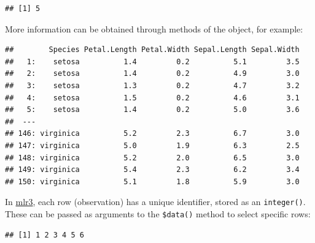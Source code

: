 \documentclass[]{scrbook}
\newenvironment{Shaded}{\begin{snugshade}}{\end{snugshade}}
\newcommand{\CommentTok}[1]{\textcolor[rgb]{0.56,0.35,0.01}{\textit{#1}}}
\newcommand{\DataTypeTok}[1]{\textcolor[rgb]{0.13,0.29,0.53}{#1}}
\newcommand{\DecValTok}[1]{\textcolor[rgb]{0.00,0.00,0.81}{#1}}
\newcommand{\KeywordTok}[1]{\textcolor[rgb]{0.13,0.29,0.53}{\textbf{#1}}}
\newcommand{\NormalTok}[1]{#1}
\newcommand{\OperatorTok}[1]{\textcolor[rgb]{0.81,0.36,0.00}{\textbf{#1}}}
\renewenvironment{Shaded} {\begin{snugshade}\small} {\end{snugshade}}
\begin{document}
\begin{verbatim}
## [1] 5
\end{verbatim}

More information can be obtained through methods of the object, for example:

\begin{Shaded}
\end{Shaded}

\begin{verbatim}
##        Species Petal.Length Petal.Width Sepal.Length Sepal.Width
##   1:    setosa          1.4         0.2          5.1         3.5
##   2:    setosa          1.4         0.2          4.9         3.0
##   3:    setosa          1.3         0.2          4.7         3.2
##   4:    setosa          1.5         0.2          4.6         3.1
##   5:    setosa          1.4         0.2          5.0         3.6
##  ---                                                            
## 146: virginica          5.2         2.3          6.7         3.0
## 147: virginica          5.0         1.9          6.3         2.5
## 148: virginica          5.2         2.0          6.5         3.0
## 149: virginica          5.4         2.3          6.2         3.4
## 150: virginica          5.1         1.8          5.9         3.0
\end{verbatim}

In \href{https://mlr3.mlr-org.com}{mlr3}, each row (observation) has a unique identifier, stored as an \texttt{integer()}.
These can be passed as arguments to the \texttt{\$data()} method to select specific rows:

\begin{Shaded}
\end{Shaded}

\begin{verbatim}
## [1] 1 2 3 4 5 6
\end{verbatim}

\begin{Shaded}
\end{Shaded}
\end{document}
